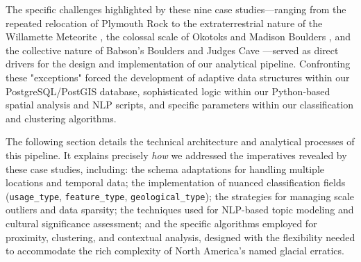 The specific challenges highlighted by these nine case studies—ranging from the repeated relocation of Plymouth Rock \cite{Seelye1997} to the extraterrestrial nature of the Willamette Meteorite \cite{AMNHWillamette}, the colossal scale of Okotoks \cite{AlbertaOkotoks} and Madison Boulders \cite{NHMadisonBoulder}, and the collective nature of Babson's Boulders \cite{wburMysteriousBoulders} and Judges Cave \cite{Dana1891}—served as direct drivers for the design and implementation of our analytical pipeline. Confronting these "exceptions" forced the development of adaptive data structures within our PostgreSQL/PostGIS database, sophisticated logic within our Python-based spatial analysis and NLP scripts, and specific parameters within our classification and clustering algorithms.

The following section details the technical architecture and analytical processes of this pipeline. It explains precisely \emph{how} we addressed the imperatives revealed by these case studies, including: the schema adaptations for handling multiple locations and temporal data; the implementation of nuanced classification fields (\texttt{usage\_type}, \texttt{feature\_type}, \texttt{geological\_type}); the strategies for managing scale outliers and data sparsity; the techniques used for NLP-based topic modeling and cultural significance assessment; and the specific algorithms employed for proximity, clustering, and contextual analysis, designed with the flexibility needed to accommodate the rich complexity of North America's named glacial erratics.
